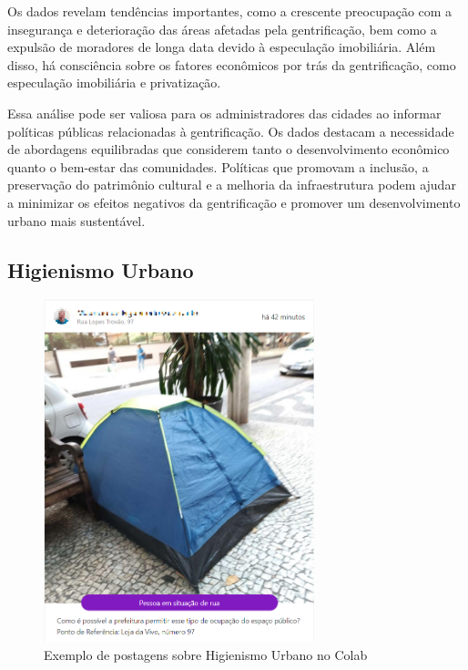 Os dados revelam tendências importantes, como a crescente preocupação com a insegurança e deterioração das áreas afetadas pela gentrificação, bem como a expulsão de moradores de longa data devido à especulação imobiliária. Além disso, há consciência sobre os fatores econômicos por trás da gentrificação, como especulação imobiliária e privatização.

Essa análise pode ser valiosa para os administradores das cidades ao informar políticas públicas relacionadas à gentrificação. Os dados destacam a necessidade de abordagens equilibradas que considerem tanto o desenvolvimento econômico quanto o bem-estar das comunidades. Políticas que promovam a inclusão, a preservação do patrimônio cultural e a melhoria da infraestrutura podem ajudar a minimizar os efeitos negativos da gentrificação e promover um desenvolvimento urbano mais sustentável.

\subsection{Higienismo Urbano}
\label{sec:eventos_populares_homeland}

\begin{figure}[htb]
	\centering
	\includegraphics[width=0.7\textwidth]{images/colab_posts_higienismo.png}
	\caption{Exemplo de postagens sobre Higienismo Urbano no Colab}
	\label{fig:colab_posts_higienismo}
\end{figure}

